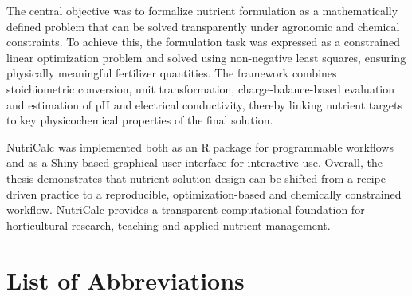 \documentclass[
  letterpaper,
  DIV=11,
  numbers=noendperiod]{scrreprt}
\begin{document}
The central objective was to formalize nutrient formulation as a
mathematically defined problem that can be solved transparently under
agronomic and chemical constraints. To achieve this, the formulation
task was expressed as a constrained linear optimization problem and
solved using non-negative least squares, ensuring physically meaningful
fertilizer quantities. The framework combines stoichiometric conversion,
unit transformation, charge-balance-based evaluation and estimation of
pH and electrical conductivity, thereby linking nutrient targets to key
physicochemical properties of the final solution.

NutriCalc was implemented both as an R package for programmable
workflows and as a Shiny-based graphical user interface for interactive
use. Overall, the thesis demonstrates that nutrient-solution design can
be shifted from a recipe-driven practice to a reproducible,
optimization-based and chemically constrained workflow. NutriCalc
provides a transparent computational foundation for horticultural
research, teaching and applied nutrient management.

\listoffigures

\listoftables

\chapter*{List of Abbreviations}\label{list-of-abbreviations}
\end{document}
